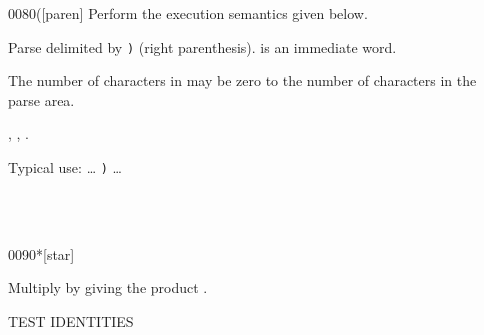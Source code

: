\begin{worddef}[p]{0080}{(}[paren]
\compile
	Perform the execution semantics given below.

\execute

	Parse  delimited by \texttt{)}
	(right parenthesis).
	 is an immediate word.

	The number of characters in  may be zero to the
	number of characters in the parse area.

\see {},
	,
	.

	\begin{rationale} %
		Typical use: {\ldots}  \texttt{)} {\ldots}
	\end{rationale}

	\begin{testing} %
		 \\[\parskip]
		 \\
	\end{testing}
\end{worddef}

\vspace*{-1.5ex}
\begin{worddef}{0090}{*}[star]
\item {}

	Multiply  by  giving the product
	.

	\begin{testing} %
		 \tab[4]  TEST IDENTITIE{\bs}S \\
		 \\
		 \\
		 \\
		 \\
		 \\
		 \\
		 \\

		 \\
		 \\
		 \\
	\end{testing}
\end{worddef}

